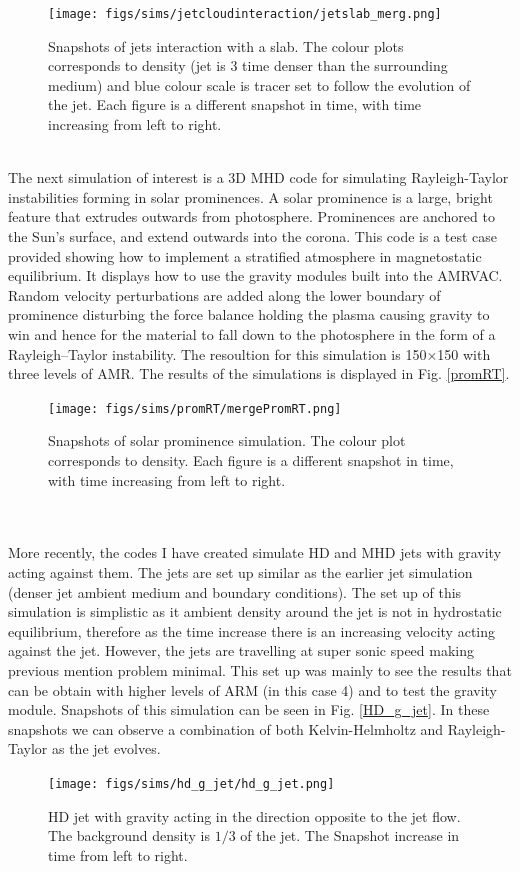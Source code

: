 \documentclass[12pt,a4paper,twoside]{article}
\begin{document}
\begin{figure}[!]
 \centering
 \texttt{[image: figs/sims/jetcloudinteraction/jetslab\_merg.png]}
 \caption{Snapshots of jets interaction with a slab. The colour plots corresponds to density (jet is 3 time denser than the surrounding medium) and blue colour scale is tracer set to follow the evolution of the jet. Each figure is a different snapshot in time, with time increasing from left to right.}
 \label{jslab}
\end{figure} \\
The next simulation of interest is a 3D MHD code for simulating Rayleigh-Taylor instabilities forming in solar prominences. A solar prominence is a large, bright feature that extrudes outwards from photosphere. Prominences are anchored to the Sun's surface, and extend outwards into the corona. This code is a test case provided showing how to implement a stratified atmosphere in magnetostatic equilibrium. It displays how to use the gravity modules built into the AMRVAC. Random velocity perturbations are added along the lower boundary of prominence disturbing the force balance holding the plasma causing gravity to win and hence for the material to fall down to the photosphere in the form of a Rayleigh–Taylor instability. The resoultion for this simulation is 150$\times$150 with three levels of AMR. The results of the simulations is displayed in Fig. \eqref{promRT}.
\begin{figure}[!]
 \centering
 \texttt{[image: figs/sims/promRT/mergePromRT.png]}
 \caption{Snapshots of solar prominence simulation.   The colour plot corresponds to density. Each figure is a different snapshot in time, with time increasing from left to right.}
  \label{promRT}
\end{figure}  \\ \\
More recently, the codes I have created simulate HD and MHD jets with gravity acting against them. The jets are set up similar as the earlier jet simulation (denser jet ambient medium and boundary conditions). The set up of this simulation is simplistic as it ambient density around the jet is not in hydrostatic equilibrium, therefore as the time increase there is an increasing velocity acting against the jet. However, the jets are travelling at super sonic speed making previous mention problem minimal. This set up was mainly to see the results that can be obtain with higher levels of ARM (in this case 4) and to test the gravity module. Snapshots of this simulation can be seen in Fig. \eqref{HD_g_jet}. In these snapshots we can observe a combination of both Kelvin-Helmholtz and Rayleigh-Taylor as the jet evolves.      
\begin{figure}[h]
 \centering
  \texttt{[image: figs/sims/hd\_g\_jet/hd\_g\_jet.png]}
  \caption{HD jet with gravity acting in the direction opposite to the jet flow. The background density is $1/3$ of the jet. The Snapshot increase in time from left to right.}
  \label{HD_g_jet}
\end{figure} \\ 
\end{document}
